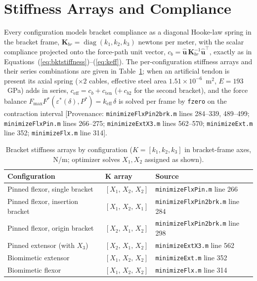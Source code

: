 \section{Stiffness Arrays and Compliance}

Every configuration models bracket compliance as a diagonal Hooke-law spring in the bracket frame, $\mathbf{K}_{br} = \operatorname{diag}(k_{1}, k_{2}, k_{3})$ newtons per meter, with the scalar compliance projected onto the force-path unit vector, $c_{b} = \hat{\mathbf{u}}\,\mathbf{K}_{br}^{-1}\hat{\mathbf{u}}^{\top}$, exactly as in Equations~(\ref{eq:bktstiffness})--(\ref{eq:keff}). The per-configuration stiffness arrays and their series combinations are given in Table~\ref{tab:app_stiffness_arrays}; when an artificial tendon is present its axial spring ($\times2$ cables, effective steel area $1.51\times10^{-6}$~m$^{2}$, $E = 193$~GPa) adds in series, $c_{\text{eff}} = c_{b} + c_{\text{ten}}$ ($+\,c_{b2}$ for the second bracket), and the force balance $F_{\max}F^{*}(\varepsilon^{*}(\delta), P^{*}) = k_{\text{eff}}\,\delta$ is solved per frame by \texttt{fzero} on the contraction interval [Provenance: \texttt{minimizeFlxPin2brk.m} lines 284--339, 489--499; \texttt{minimizeFlxPin.m} lines 266--275; \texttt{minimizeExtX3.m} lines 562--570; \texttt{minimizeExt.m} line 352; \texttt{minimizeFlx.m} line 314].

\begin{table}[htbp]
\caption{Bracket stiffness arrays by configuration ($K = [k_{1}, k_{2}, k_{3}]$ in bracket-frame axes, N/m; optimizer solves $X_{1}, X_{2}$ assigned as shown).}
\label{tab:app_stiffness_arrays}
\begin{tabular}{@{}lll@{}}
\toprule
\textbf{Configuration} & $\boldsymbol{K}$ array & \textbf{Source} \\
\midrule
Pinned flexor, single bracket       & $[X_{1},\,X_{2},\,X_{2}]$ & \texttt{minimizeFlxPin.m} line 266 \\
Pinned flexor, insertion bracket    & $[X_{1},\,X_{2},\,X_{1}]$ & \texttt{minimizeFlxPin2brk.m} line 284 \\
Pinned flexor, origin bracket       & $[X_{2},\,X_{1},\,X_{2}]$ & \texttt{minimizeFlxPin2brk.m} line 298 \\
Pinned extensor (with $X_{3}$)      & $[X_{2},\,X_{1},\,X_{2}]$ & \texttt{minimizeExtX3.m} line 562 \\
Biomimetic extensor                 & $[X_{1},\,X_{2},\,X_{2}]$ & \texttt{minimizeExt.m} line 352 \\
Biomimetic flexor                   & $[X_{1},\,X_{2},\,X_{2}]$ & \texttt{minimizeFlx.m} line 314 \\
\bottomrule
\end{tabular}
\end{table}

